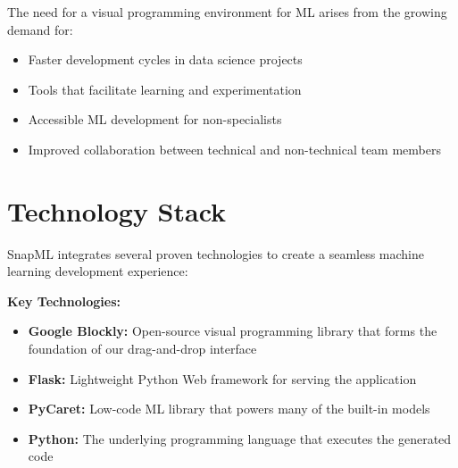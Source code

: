 \documentclass[a0paper,portrait]{article}
\newcommand{\compresslist}{%
\setlength{\itemsep}{0pt}%
\setlength{\parskip}{0pt}%
\setlength{\parsep}{0pt}%
}
\begin{document}
\begin{multicols}{2}
The need for a visual programming environment for ML arises from the growing demand for:
\begin{itemize}\compresslist
    \item Faster development cycles in data science projects
    \item Tools that facilitate learning and experimentation
    \item Accessible ML development for non-specialists
    \item Improved collaboration between technical and non-technical team members
\end{itemize}

\section{Technology Stack}

SnapML integrates several proven technologies to create a seamless machine learning development experience:

\begin{center}
\end{center}

\textbf{Key Technologies:}
\begin{itemize}\compresslist
    \item \textbf{Google Blockly:} Open-source visual programming library that forms the foundation of our drag-and-drop interface
    \item \textbf{Flask:} Lightweight Python Web framework for serving the application
    \item \textbf{PyCaret:} Low-code ML library that powers many of the built-in models
    \item \textbf{Python:} The underlying programming language that executes the generated code
\end{itemize}


\end{multicols}
\end{document}
